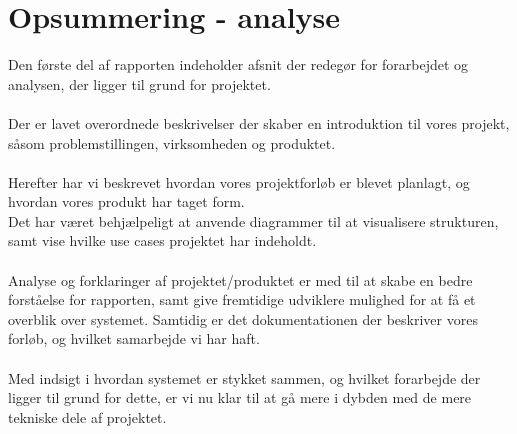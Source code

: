 \hypertarget{delkonklusion-analyse}{}
\section{Opsummering - analyse}
Den første del af rapporten indeholder afsnit der redegør for forarbejdet og analysen, der ligger til grund for projektet.
\\\\
Der er lavet overordnede beskrivelser der skaber en introduktion til vores projekt, såsom problemstillingen, virksomheden og produktet.
\\\\
Herefter har vi beskrevet hvordan vores projektforløb er blevet planlagt, og hvordan vores produkt har taget form.\\
Det har været behjælpeligt at anvende diagrammer til at visualisere strukturen, samt vise hvilke use cases projektet har indeholdt.
\\\\
Analyse og forklaringer af projektet/produktet er med til at skabe en bedre forståelse for rapporten, samt give fremtidige udviklere
mulighed for at få et overblik over systemet. Samtidig er det dokumentationen der beskriver vores forløb, og hvilket samarbejde vi har haft.
\\\\
Med indsigt i hvordan systemet er stykket sammen, og hvilket forarbejde der ligger til grund for dette, er vi nu klar til at gå mere i dybden med de mere tekniske dele af projektet.
